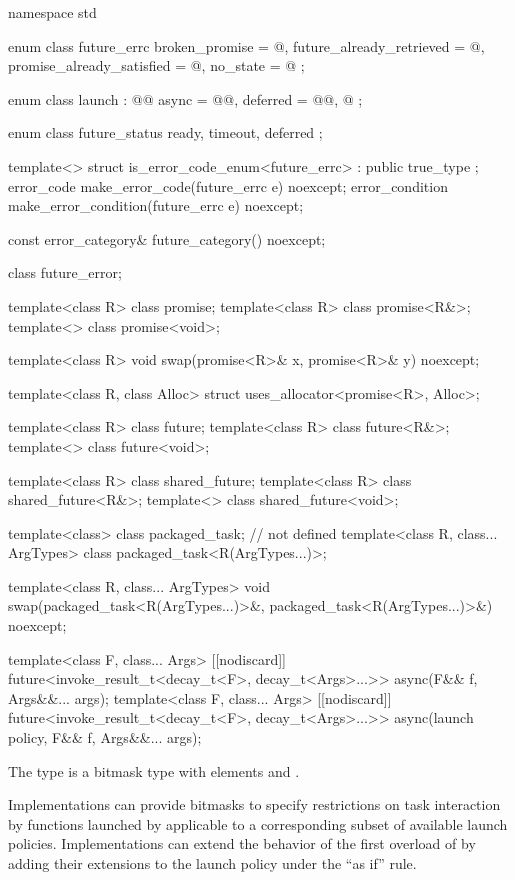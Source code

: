 %
%
\begin{codeblock}
namespace std {
  enum class future_errc {
    broken_promise = @\impdef@,
    future_already_retrieved = @\impdef@,
    promise_already_satisfied = @\impdef@,
    no_state = @\impdef@
  };

  enum class launch : @\unspec{}@ {
    async = @\unspec{}@,
    deferred = @\unspec{}@,
    @\impdef@
  };

  enum class future_status {
    ready,
    timeout,
    deferred
  };

  template<> struct is_error_code_enum<future_errc> : public true_type { };
  error_code make_error_code(future_errc e) noexcept;
  error_condition make_error_condition(future_errc e) noexcept;

  const error_category& future_category() noexcept;

  class future_error;

  template<class R> class promise;
  template<class R> class promise<R&>;
  template<> class promise<void>;

  template<class R>
    void swap(promise<R>& x, promise<R>& y) noexcept;

  template<class R, class Alloc>
    struct uses_allocator<promise<R>, Alloc>;

  template<class R> class future;
  template<class R> class future<R&>;
  template<> class future<void>;

  template<class R> class shared_future;
  template<class R> class shared_future<R&>;
  template<> class shared_future<void>;

  template<class> class packaged_task;  // not defined
  template<class R, class... ArgTypes>
    class packaged_task<R(ArgTypes...)>;

  template<class R, class... ArgTypes>
    void swap(packaged_task<R(ArgTypes...)>&, packaged_task<R(ArgTypes...)>&) noexcept;

  template<class F, class... Args>
    [[nodiscard]] future<invoke_result_t<decay_t<F>, decay_t<Args>...>>
      async(F&& f, Args&&... args);
  template<class F, class... Args>
    [[nodiscard]] future<invoke_result_t<decay_t<F>, decay_t<Args>...>>
      async(launch policy, F&& f, Args&&... args);
}
\end{codeblock}

\pnum
The  type  is a bitmask type with
elements  and .
\begin{note}
Implementations can provide bitmasks to specify restrictions on task
interaction by functions launched by  applicable to a
corresponding subset of available launch policies. Implementations can extend
the behavior of the first overload of  by adding their extensions
to the launch policy under the ``as if'' rule.
\end{note}

